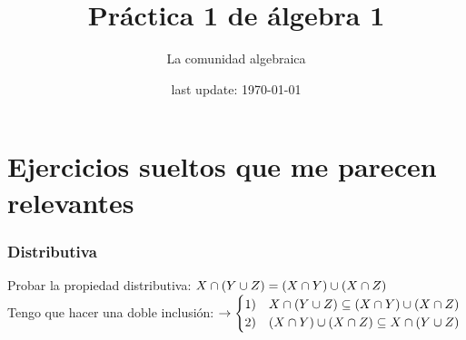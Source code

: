 



 



\pagestyle{empty} %

\title{Práctica 1 de álgebra 1} %
\author{La comunidad algebraica} %

\date{last update: \today} %



\section*{Ejercicios sueltos que me parecen relevantes}
\subsubsection*{Distributiva}
Probar la propiedad distributiva: $X \cap (Y \cup Z) = (X \cap Y) \cup (X \cap Z)$\\
Tengo que hacer una doble inclusión:
$\to \begin{cases}
		1) & X \cap (Y \cup Z) \subseteq (X \cap Y) \cup (X \cap Z) \\
		2) & (X \cap Y) \cup (X \cap Z) \subseteq X \cap (Y \cup Z)
	\end{cases}$

